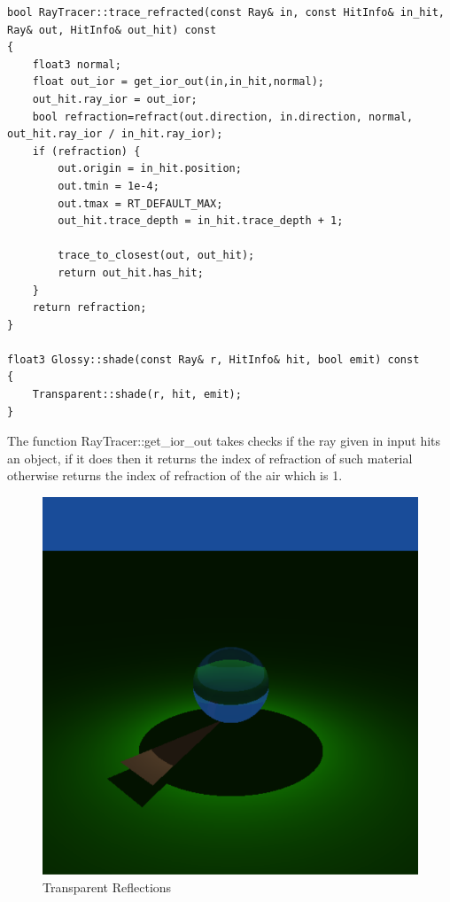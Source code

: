 \begin{lstlisting}
bool RayTracer::trace_refracted(const Ray& in, const HitInfo& in_hit, Ray& out, HitInfo& out_hit) const
{
	float3 normal;
	float out_ior = get_ior_out(in,in_hit,normal);
	out_hit.ray_ior = out_ior;
	bool refraction=refract(out.direction, in.direction, normal, out_hit.ray_ior / in_hit.ray_ior);
	if (refraction) {
		out.origin = in_hit.position;
		out.tmin = 1e-4;
		out.tmax = RT_DEFAULT_MAX;
		out_hit.trace_depth = in_hit.trace_depth + 1;
		
		trace_to_closest(out, out_hit);
		return out_hit.has_hit;
	}
	return refraction;
}

float3 Glossy::shade(const Ray& r, HitInfo& hit, bool emit) const
{
	Transparent::shade(r, hit, emit);
}
\end{lstlisting}
The function RayTracer::get\_ior\_out takes checks if the ray given in input hits an object, if it does then it returns the index of refraction of such material otherwise returns the index of refraction of the air which is 1.
\begin{figure}[H]
	\centering
	\includegraphics[scale=\imagescale]{images/worksheet_2/part_3}
	\caption{Transparent Reflections}
	\label{fig:transparent_reflections}
\end{figure}

